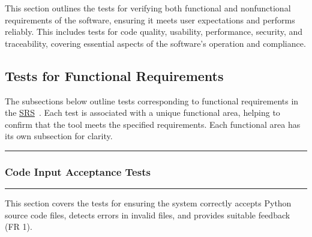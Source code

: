 \documentclass[12pt, titlepage]{article}
\newcommand{\SRS}{\href{https://github.com/ssm-lab/capstone--source-code-optimizer/blob/main/docs/SRS/SRS.pdf}{SRS}}
\newcommand{\colorrule}{\textcolor{BlueViolet}{\rule{\linewidth}{2pt}}}
\begin{document}
This section outlines the tests for verifying both functional and
nonfunctional requirements of the software, ensuring it meets user
expectations and performs reliably. This includes tests for code
quality, usability, performance, security, and traceability, covering
essential aspects of the software’s operation and compliance.

\subsection{Tests for Functional Requirements}

The subsections below outline tests corresponding to functional
requirements in the \SRS~\cite{SRS}. Each test is associated with a
unique functional area, helping to confirm that the tool meets the
specified requirements. Each functional area has its own subsection for clarity.

\noindent
\colorrule

\subsubsection{Code Input Acceptance Tests}
\colorrule

\medskip

\noindent
This section covers the tests for ensuring the system correctly
accepts Python source code files, detects errors in invalid files,
and provides suitable feedback (FR 1).
\end{document}
